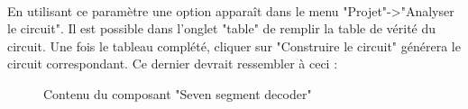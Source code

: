 \paragraph{}
En utilisant ce paramètre une option apparaît dans le menu "Projet"->"Analyser le circuit". Il est possible dans l'onglet "table" de remplir la table de vérité du circuit. Une fois le tableau complété, cliquer sur "Construire le circuit" générera le circuit correspondant. Ce dernier devrait ressembler à ceci :
\begin{figure}[H]
	\caption{Contenu du composant "Seven segment decoder"}
\end{figure}


